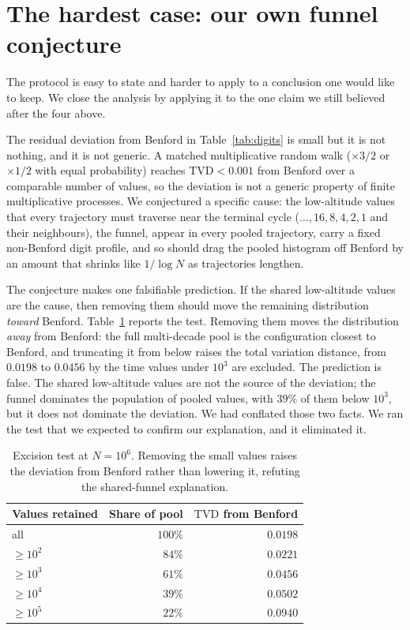 \documentclass[11pt]{amsart}
\newcommand{\TVD}{\mathrm{TVD}}
\begin{document}
\section{The hardest case: our own funnel conjecture}\label{sec:capstone}

The protocol is easy to state and harder to apply to a conclusion one would like to keep. We close the analysis by applying it to the one claim we still believed after the four above.

The residual deviation from Benford in Table~\ref{tab:digits} is small but it is not nothing, and it is not generic. A matched multiplicative random walk ($\times 3/2$ or $\times 1/2$ with equal probability) reaches $\TVD < 0.001$ from Benford over a comparable number of values, so the deviation is not a generic property of finite multiplicative processes. We conjectured a specific cause: the low-altitude values that every trajectory must traverse near the terminal cycle ($\dots, 16, 8, 4, 2, 1$ and their neighbours), the funnel, appear in every pooled trajectory, carry a fixed non-Benford digit profile, and so should drag the pooled histogram off Benford by an amount that shrinks like $1/\log N$ as trajectories lengthen.

The conjecture makes one falsifiable prediction. If the shared low-altitude values are the cause, then removing them should move the remaining distribution \emph{toward} Benford. Table~\ref{tab:excision} reports the test. Removing them moves the distribution \emph{away} from Benford: the full multi-decade pool is the configuration closest to Benford, and truncating it from below raises the total variation distance, from $0.0198$ to $0.0456$ by the time values under $10^3$ are excluded. The prediction is false. The shared low-altitude values are not the source of the deviation; the funnel dominates the population of pooled values, with $39\%$ of them below $10^3$, but it does not dominate the deviation. We had conflated those two facts. We ran the test that we expected to confirm our explanation, and it eliminated it.

\begin{table}[ht]
\centering
\caption{Excision test at $N = 10^6$. Removing the small values raises the deviation from Benford rather than lowering it, refuting the shared-funnel explanation.}
\label{tab:excision}
\begin{tabular}{lrr}
\toprule
Values retained & Share of pool & $\TVD$ from Benford \\
\midrule
all & $100\%$ & $0.0198$ \\
$\ge 10^2$ & $84\%$ & $0.0221$ \\
$\ge 10^3$ & $61\%$ & $0.0456$ \\
$\ge 10^4$ & $39\%$ & $0.0502$ \\
$\ge 10^5$ & $22\%$ & $0.0940$ \\
\bottomrule
\end{tabular}
\end{table}
\end{document}
